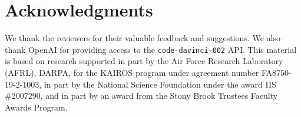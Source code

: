 \section*{Acknowledgments}

We thank the reviewers for their valuable feedback and suggestions. We also thank OpenAI for providing access to the \texttt{code-davinci-002} API. This material is based on research supported in part by the Air Force Research Laboratory (AFRL), DARPA, for the KAIROS program under agreement number FA8750-19-2-1003, in part by the National Science Foundation under the award IIS \#2007290, and in part by an award from the Stony Brook Trustees Faculty Awards Program.